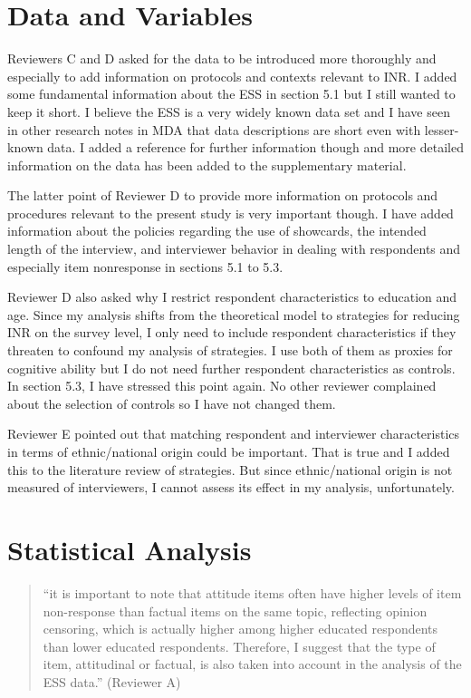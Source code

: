 \documentclass[a4paper, 12pt]{article}
\begin{document}
\section{Data and Variables}

Reviewers C and D asked for the data to be introduced more thoroughly and especially to add information on protocols and contexts relevant to INR. I added some fundamental information about the ESS in section 5.1 but I still wanted to keep it short. I believe the ESS is a very widely known data set and I have seen in other research notes in MDA that data descriptions are short even with lesser-known data. I added a reference for further information though and more detailed information on the data has been added to the supplementary material.

The latter point of Reviewer D to provide more information on protocols and procedures relevant to the present study is very important though. I have added information about the policies regarding the use of showcards, the intended length of the interview, and interviewer behavior in dealing with respondents and especially item nonresponse in sections 5.1 to 5.3.

Reviewer D also asked why I restrict respondent characteristics to education and age. Since my analysis shifts from the theoretical model to strategies for reducing INR on the survey level, I only need to include respondent characteristics if they threaten to confound my analysis of strategies. I use both of them as proxies for cognitive ability but I do not need further respondent characteristics as controls. In section 5.3, I have stressed this point again. No other reviewer complained about the selection of controls so I have not changed them.

Reviewer E pointed out that matching respondent and interviewer characteristics in terms of ethnic/national origin could be important. That is true and I added this to the literature review of strategies. But since ethnic/national origin is not measured of interviewers, I cannot assess its effect in my analysis, unfortunately.

\section{Statistical Analysis}

\begin{quotation}
``it is important to note that attitude items often have higher levels of item non-response than factual items on the same topic, reflecting opinion censoring, which is actually higher among higher educated respondents than lower educated respondents. Therefore, I suggest that the type of item, attitudinal or factual, is also taken into account in the analysis of the ESS data.'' (Reviewer A)
\end{quotation}
\end{document}
